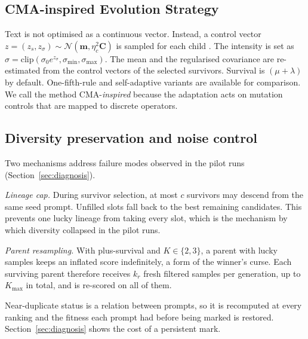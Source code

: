 \documentclass[preprint,12pt,authoryear]{elsarticle}
\begin{document}
\subsection{CMA-inspired Evolution Strategy}
Text is not optimised as a continuous vector. Instead, a control vector $z=(z_s,z_\sigma)\sim\mathcal N(\mathbf m,\eta_c^2\mathbf C)$ is sampled for each child \citep{hansen2016cma,beyer2002es}. The intensity is set as $\sigma=\mathrm{clip}(\sigma_0 e^{z_\sigma},\sigma_{\min},\sigma_{\max})$. The mean and the regularised covariance are re-estimated from the control vectors of the selected survivors. Survival is $(\mu+\lambda)$ by default. One-fifth-rule and self-adaptive variants are available for comparison. We call the method CMA-\emph{inspired} because the adaptation acts on mutation controls that are mapped to discrete operators.

\subsection{Diversity preservation and noise control}
Two mechanisms address failure modes observed in the pilot runs (Section~\ref{sec:diagnosis}).

\emph{Lineage cap.} During survivor selection, at most $c$ survivors may descend from the same seed prompt. Unfilled slots fall back to the best remaining candidates. This prevents one lucky lineage from taking every slot, which is the mechanism by which diversity collapsed in the pilot runs.

\emph{Parent resampling.} With plus-survival and $K\in\{2,3\}$, a parent with lucky samples keeps an inflated score indefinitely, a form of the winner's curse. Each surviving parent therefore receives $k_r$ fresh filtered samples per generation, up to $K_{\max}$ in total, and is re-scored on all of them.

Near-duplicate status is a relation between prompts, so it is recomputed at every ranking and the fitness each prompt had before being marked is restored. Section~\ref{sec:diagnosis} shows the cost of a persistent mark.
\end{document}
